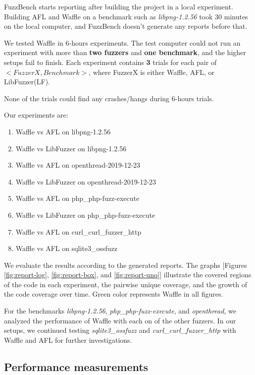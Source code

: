 FuzzBench starts reporting after building the project in a local experiment. Building AFL and Waffle on a benchmark such as \textit{libpng-1.2.56} took 30 minutes on the local computer, and FuzzBench doesn't generate any reports before that.

We tested Waffle in 6-hours experiments. The test computer could not run an experiment with more than \textbf{two fuzzers} and \textbf{one benchmark}, and the higher setups fail to finish. Each experiment contains \textbf{3} trials for each pair of $<FuzzerX, Benchmark>$, where FuzzerX is either Waffle, AFL, or LibFuzzer(LF). 

None of the trials could find any crashes/hangs during 6-hours trials.

Our experiments are:

\begin{enumerate}
    \item Waffle vs AFL on libpng-1.2.56
    \item Waffle vs LibFuzzer on libpng-1.2.56
    \item Waffle vs AFL on openthread-2019-12-23
    \item Waffle vs LibFuzzer on openthread-2019-12-23
    \item Waffle vs AFL on php\_php-fuzz-execute
    \item Waffle vs LibFuzzer on php\_php-fuzz-execute
    \item Waffle vs AFL on curl\_curl\_fuzzer\_http
    \item Waffle vs AFL on sqlite3\_ossfuzz
\end{enumerate}

We evaluate the results according to the generated reports. The graphs [Figures \ref{fig:report-log}, \ref{fig:report-box}, and \ref{fig:report-unq}] illustrate the covered regions of the code in each experiment, the pairwise unique coverage, and the growth of the code coverage over time. Green color represents Waffle in all figures.



For the benchmarks \textit{libpng-1.2.56}, \textit{php\_php-fuzz-execute}, and \textit{openthread}, we analyzed the performance of Waffle with each on of the other fuzzers. In our setups, we continued testing \textit{sqlite3\_ossfuzz} and \textit{curl\_curl\_fuzzer\_http} with Waffle and AFL for further investigations.

\subsection*{Performance measurements}

